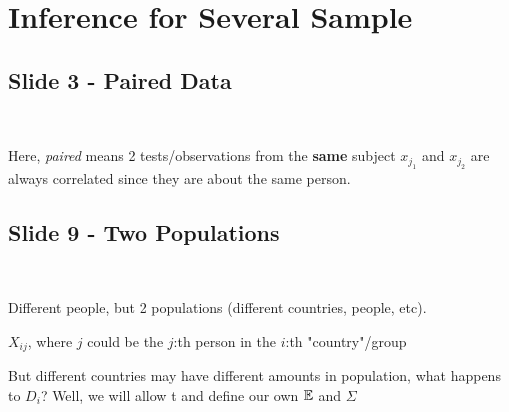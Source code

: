 \section{Inference for Several Sample}
\subsection{Slide 3 - Paired Data}\hfill\\
\par\bigskip
\noindent Here, \textit{paired} means 2 tests/observations from the \textbf{same}  subject $x_{j_1}$ and $x_{j_2}$ are always correlated since they are about the same person.
\par\bigskip
\subsection{Slide 9 - Two Populations}\hfill\\
\par\bigskip
\noindent Different people, but 2 populations (different countries, people, etc).
\par\bigskip
\noindent $X_{ij}$, where $j$ could be the $j$:th person in the $i$:th "country"/group
\par\bigskip
\noindent But different countries may have different amounts in population, what happens to $D_i$? Well, we will allow t and define our own $\mathbb{E}$ and $\Sigma$
\par\bigskip
